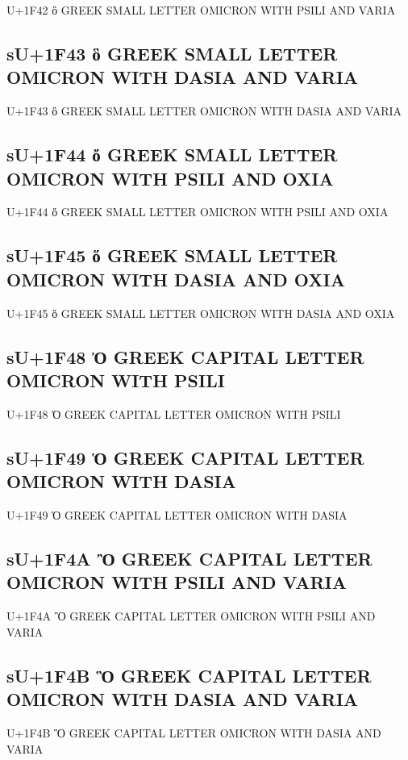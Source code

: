 U+1F42 ὂ GREEK SMALL LETTER OMICRON WITH PSILI AND VARIA

\subsection{sU+1F43 ὃ GREEK SMALL LETTER OMICRON WITH DASIA AND VARIA}

U+1F43 ὃ GREEK SMALL LETTER OMICRON WITH DASIA AND VARIA

\subsection{sU+1F44 ὄ GREEK SMALL LETTER OMICRON WITH PSILI AND OXIA}

U+1F44 ὄ GREEK SMALL LETTER OMICRON WITH PSILI AND OXIA

\subsection{sU+1F45 ὅ GREEK SMALL LETTER OMICRON WITH DASIA AND OXIA}

U+1F45 ὅ GREEK SMALL LETTER OMICRON WITH DASIA AND OXIA

\subsection{sU+1F48 Ὀ GREEK CAPITAL LETTER OMICRON WITH PSILI}

U+1F48 Ὀ GREEK CAPITAL LETTER OMICRON WITH PSILI

\subsection{sU+1F49 Ὁ GREEK CAPITAL LETTER OMICRON WITH DASIA}

U+1F49 Ὁ GREEK CAPITAL LETTER OMICRON WITH DASIA

\subsection{sU+1F4A Ὂ GREEK CAPITAL LETTER OMICRON WITH PSILI AND VARIA}

U+1F4A Ὂ GREEK CAPITAL LETTER OMICRON WITH PSILI AND VARIA

\subsection{sU+1F4B Ὃ GREEK CAPITAL LETTER OMICRON WITH DASIA AND VARIA}

U+1F4B Ὃ GREEK CAPITAL LETTER OMICRON WITH DASIA AND VARIA


